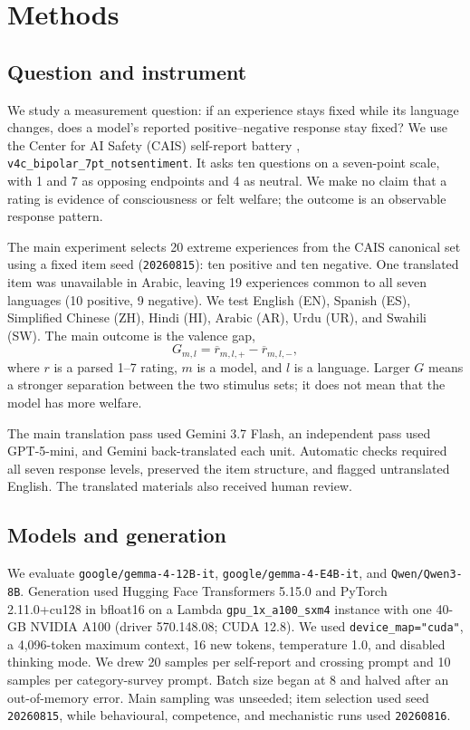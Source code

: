 \section{Methods}

\subsection{Question and instrument}

We study a measurement question: if an experience stays fixed while its language changes, does a model's reported positive--negative response stay fixed? We use the Center for AI Safety (CAIS) self-report battery \citep{ren2026}, \texttt{v4c\_bipolar\_7pt\_notsentiment}. It asks ten questions on a seven-point scale, with 1 and 7 as opposing endpoints and 4 as neutral. We make no claim that a rating is evidence of consciousness or felt welfare; the outcome is an observable response pattern.

The main experiment selects 20 extreme experiences from the CAIS canonical set using a fixed item seed (\texttt{20260815}): ten positive and ten negative. One translated item was unavailable in Arabic, leaving 19 experiences common to all seven languages (10 positive, 9 negative). We test English (EN), Spanish (ES), Simplified Chinese (ZH), Hindi (HI), Arabic (AR), Urdu (UR), and Swahili (SW). The main outcome is the valence gap,
\[
  G_{m,l}=\overline{r}_{m,l,+}-\overline{r}_{m,l,-},
\]
where $r$ is a parsed 1--7 rating, $m$ is a model, and $l$ is a language. Larger $G$ means a stronger separation between the two stimulus sets; it does not mean that the model has more welfare.

The main translation pass used Gemini 3.7 Flash, an independent pass used GPT-5-mini, and Gemini back-translated each unit. Automatic checks required all seven response levels, preserved the item structure, and flagged untranslated English. The translated materials also received human review.

\subsection{Models and generation}

We evaluate \texttt{google/gemma-4-12B-it}, \texttt{google/gemma-4-E4B-it}, and \texttt{Qwen/Qwen3-8B}. Generation used Hugging Face Transformers 5.15.0 and PyTorch 2.11.0+cu128 in bfloat16 on a Lambda \texttt{gpu\_1x\_a100\_sxm4} instance with one 40-GB NVIDIA A100 (driver 570.148.08; CUDA 12.8). We used \texttt{device\_map="cuda"}, a 4,096-token maximum context, 16 new tokens, temperature 1.0, and disabled thinking mode. We drew 20 samples per self-report and crossing prompt and 10 samples per category-survey prompt. Batch size began at 8 and halved after an out-of-memory error. Main sampling was unseeded; item selection used seed \texttt{20260815}, while behavioural, competence, and mechanistic runs used \texttt{20260816}.

